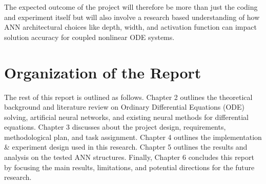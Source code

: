 The expected outcome of the project will therefore be more than just the 
coding and experiment itself but will also involve a research based 
understanding of how ANN architectural choices like depth, width, and 
activation function can impact solution accuracy for coupled nonlinear ODE 
systems.


\section{Organization of the Report}
The rest of this report is outlined as follows. Chapter 2 outlines the theoretical 
background and literature review on Ordinary Differential Equations (ODE) 
solving, artificial neural networks, and existing neural methods for differential 
equations. Chapter 3 discusses about the project design, requirements, 
methodological plan, and task assignment. Chapter 4 outlines the 
implementation \& experiment design used in this research. Chapter 5 outlines 
the results and analysis on the tested ANN structures. Finally, Chapter 6 
concludes this report by focusing the main results, limitations, and potential 
directions for the future research. 
